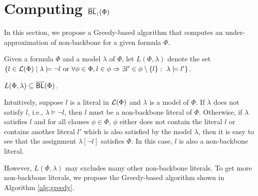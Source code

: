 
\section{Computing ${\sf \overline{BL}_\downharpoonright}(\Phi)$}
In this section, we propose a Greedy-based algorithm that computes an under-approximation of non-backbone for a given formula
$\Phi$.

Given a formula $\Phi$ and a model $\lambda$ of $\Phi$, let $L(\Phi,\lambda)$
denote the set $\{l\in{\cal L}(\Phi) \mid \lambda\models \neg l \ \mbox{or} \  \forall \phi\in\Phi, l\in\phi\Rightarrow \exists l'\in\phi\setminus\{l\}: \ \lambda\models l'\}$.


\begin{lemma} \label{lem:navie}
 $L(\Phi,\lambda)\subseteq\overline{\textsf{BL}}(\Phi)$.
\end{lemma}
Intuitively, suppose $l$ is a literal in ${\cal L}(\Phi)$ and $\lambda$ is a model of $\Phi$.
If $\lambda$ does not satisfy $l$, i.e.,  $\lambda\models  \neg l$, then $l$ must be a non-backbone literal of $\Phi$.
Otherwise, if $\lambda$ satisfies $l$ and for all clauses $\phi\in\Phi$, $\phi$ either does not contain the literal
$l$ or contains another literal $l'$ which is also satisfied by the model $\lambda$, then it is easy to see that
the assignment $\lambda[\neg l]$ satisfies $\Phi$.
In this case, $l$ is also a non-backbone literal.

However, $L(\Phi,\lambda)$ may excludes many other non-backbone literals.
To get more non-backbone literals, we propose the Greedy-based algorithm shown in Algorithm \ref{alg:greedy}.

